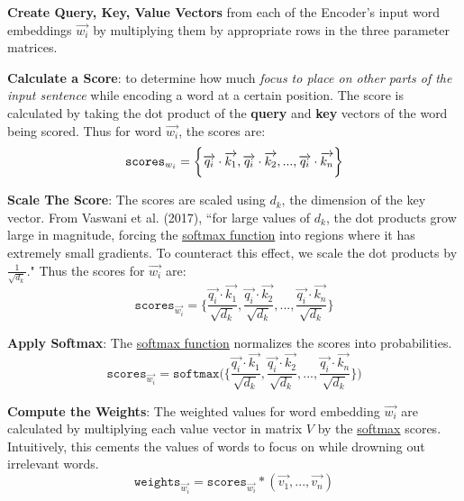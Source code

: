 \begin{enumerateSpaced}{2pt}
    \item \textbf{Create Query, Key, Value Vectors} from each of the Encoder's input word embeddings $\overrightarrow{w_i}$ by multiplying them by appropriate rows in the three parameter matrices. 

    \item \textbf{Calculate a Score}: to determine how much \emph{focus to place on other parts of the input sentence} while encoding a word at a certain position.  The score is calculated by taking the dot product of the \textbf{query} and \textbf{key} vectors of the word being scored. Thus for word $\overrightarrow{w_i}$, the scores are: 
    $$
    \texttt{scores}_{\Large w_i} = \bigg\{
    \overrightarrow{q_i} \cdot \overrightarrow{k_1},
    \overrightarrow{q_i} \cdot \overrightarrow{k_2},
    ...,
    \overrightarrow{q_i} \cdot \overrightarrow{k_n} \bigg\}
    $$

    \item \textbf{Scale The Score}: The scores are scaled using $d_k$, the dimension of the key vector. From Vaswani et al. (2017), ``for large values of $d_k$, the dot products grow large in  magnitude, forcing the \hyperref[cnc:softmaxLayer]{softmax function} into regions where it has extremely small gradients. To counteract this effect, we scale the dot products by $\frac {1} {\sqrt{d_k}}$." Thus the scores for $\overrightarrow{w_i}$ are:
    $$
    \texttt{scores}_{\overrightarrow{w_i}} = \Bigg\{
    \frac {\overrightarrow{q_i} \cdot \overrightarrow{k_1}} {\sqrt{d_k}},
    \frac {\overrightarrow{q_i} \cdot \overrightarrow{k_2}} {\sqrt{d_k}},
    ...,
    \frac{\overrightarrow{q_i} \cdot \overrightarrow{k_n}} {\sqrt{d_k}} \Bigg\}
    $$
    
    \item \textbf{Apply Softmax}: The \hyperref[cnc:softmaxLayer]{softmax function} normalizes the scores into probabilities. 
    $$
    \texttt{scores}_{\overrightarrow{w_i}} = \texttt{softmax} \Bigg( \Bigg\{
    \frac {\overrightarrow{q_i} \cdot \overrightarrow{k_1}} {\sqrt{d_k}},
    \frac {\overrightarrow{q_i} \cdot \overrightarrow{k_2}} {\sqrt{d_k}},
    ...,
    \frac{\overrightarrow{q_i} \cdot \overrightarrow{k_n}} {\sqrt{d_k}} \Bigg\} \Bigg)
    $$

    \item \textbf{Compute the Weights}: The weighted values for word embedding $\overrightarrow{w_i}$ are calculated by multiplying each value vector in matrix $V$ by the \hyperref[cnc:softmaxLayer]{softmax} scores. Intuitively, this cements the values of words to focus on while drowning out irrelevant words. 
    $$
    \texttt{weights}_{\overrightarrow{w_i}} = \texttt{scores}_{\overrightarrow{w_i}} * (\overrightarrow{v_1}, ..., \overrightarrow{v_n})
    $$


\end{enumerateSpaced}
